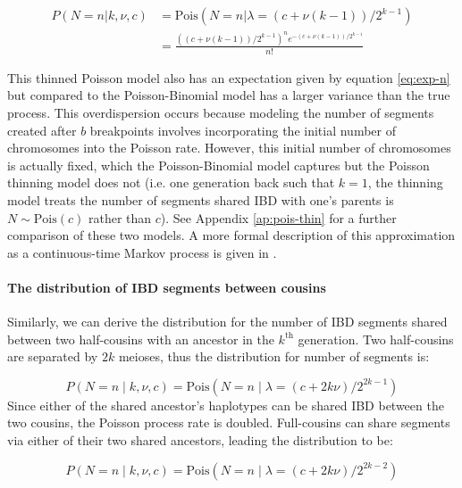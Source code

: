 \documentclass[11pt]{article}
\begin{document}
\begin{align}
\label{eq:auto-segment-number}
  P(N = n | k, \nu, c) &= \text{Pois}(N = n | \lambda = (c + \nu (k-1))/2^{k-1}) \nonumber \\
                       &= \frac{((c + \nu (k-1))/2^{k-1})^n  e^{- (c + \nu (k-1))/{2^{k - 1}}}}{n!}
\end{align}

This thinned Poisson model also has an expectation given by equation
\eqref{eq:exp-n} but compared to the Poisson-Binomial model has a larger
variance than the true process. This overdispersion occurs because modeling the
number of segments created after $b$ breakpoints involves incorporating the
initial number of chromosomes into the Poisson rate. However, this initial
number of chromosomes is actually fixed, which the Poisson-Binomial model
captures but the Poisson thinning model does not (i.e. one generation back such
that $k=1$, the thinning model treats the number of segments shared IBD with
one's parents is $N \sim \text{Pois}(c)$ rather than $c$). See Appendix
\ref{ap:pois-thin} for a further comparison of these two models. A more formal
description of this approximation as a continuous-time Markov process is given
in \textcite{thomas:1994hg}.

\paragraph{The distribution of IBD segments between cousins}

Similarly, we can derive the distribution for the number of IBD segments shared
between two half-cousins with an ancestor in the $k^\text{th}$ generation. Two
half-cousins are separated by $2k$ meioses, thus the distribution for number of
segments is:

\begin{equation} \label{eq:auto-seg-cousins}
 P(N=n \;|\; k, \nu, c) = \text{Pois}\left(N = n \;|\; \lambda=(c + 2 k \nu)/2^{2 k - 1} \right)
\end{equation}
%
Since either of the shared ancestor's haplotypes can be shared IBD between the
two cousins, the Poisson process rate is doubled. Full-cousins can share segments
via either of their two shared ancestors, leading the distribution to be:

\begin{equation}
  P(N=n \;|\; k, \nu, c) = \text{Pois}\left(N = n \;|\; \lambda=(c + 2 k \nu)/2^{2 k - 2} \right)
\end{equation}
\end{document}
